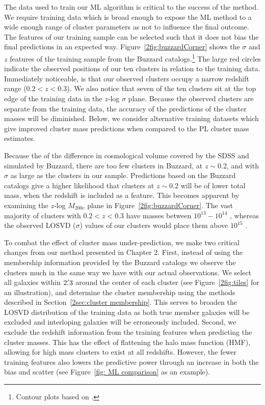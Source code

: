 The data used to train our ML algorithm is critical to the success of the method. We require training data which is broad enough to expose the ML method to a wide enough range of cluster parameters as not to influence the final outcome. The features of our training sample can be selected such that it does not bias the final predictions in an expected way. Figure~\ref{2fig:buzzardCorner} shows the $\sigma$ and $z$ features of the training sample from the Buzzard catalogs.\footnote{Contour plots based on \cite{Foreman-Mackey2016}.} The large red circles indicate the observed positions of our ten clusters in relation to the training data. Immediately noticeable, is that our observed clusters occupy a narrow redshift range ($0.2< z <0.3$). We also notice that seven of the ten clusters sit at the top edge of the training data in the $z$-log $\sigma$ plane. Because the observed clusters are separate from the training data, the accuracy of the predictions of the cluster masses will be diminished. Below, we consider alternative training datasets which give improved cluster mass predictions when compared to the PL cluster mass estimates.

Because the of the difference in cosmological volume covered by the SDSS and simulated by Buzzard, there are too few clusters in Buzzard, at $z\sim0.2$, and with $\sigma$ as large as the clusters in our sample. Predictions based on the Buzzard catalogs give a higher likelihood that clusters at $z\sim0.2$ will be of lower total mass, when the redshift is included as a feature. This becomes apparent by examining the $z$-log $M_{200c}$ plane in Figure~\ref{2fig:buzzardCorner}. The vast majority of clusters with $0.2< z <0.3$ have masses between $10^{13} - 10^{14}$ \Msol, whereas the observed LOSVD ($\sigma$) values of our clusters would place them above $10^{15}$ \Msol. 

To combat the effect of cluster mass under-prediction, we make two critical changes from our method presented in Chapter 2. First, instead of using the membership information provided by the Buzzard catalogs we observe the clusters much in the same way we have with our actual observations. We select all galaxies within $2\mbox{\ensuremath{.\mkern-4mu^\prime}}3$ around the center of each cluster (see Figure~\ref{2fig:tiles} for an illustration), and determine the cluster membership using the methods described in Section~\ref{2sec:cluster membership}. This serves to broaden the LOSVD distribution of the training data as both true member galaxies will be excluded and interloping galaxies will be erroneously included. Second, we exclude the redshift information from the training features when predicting the cluster masses. This has the effect of flattening the halo mass function (HMF), allowing for high mass clusters to exist at all redshifts. However, the fewer training features also lowers the predictive power through an increase in both the bias and scatter (see Figure~\ref{fig: ML comparison} as an example). 

